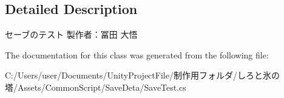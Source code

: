 \subsection{Detailed Description}
セーブのテスト 製作者：冨田 大悟 



The documentation for this class was generated from the following file\+:\begin{DoxyCompactItemize}
\item 
C\+:/\+Users/user/\+Documents/\+Unity\+Project\+File/制作用フォルダ/しろと氷の塔/\+Assets/\+Common\+Script/\+Save\+Deta/Save\+Test.\+cs\end{DoxyCompactItemize}
